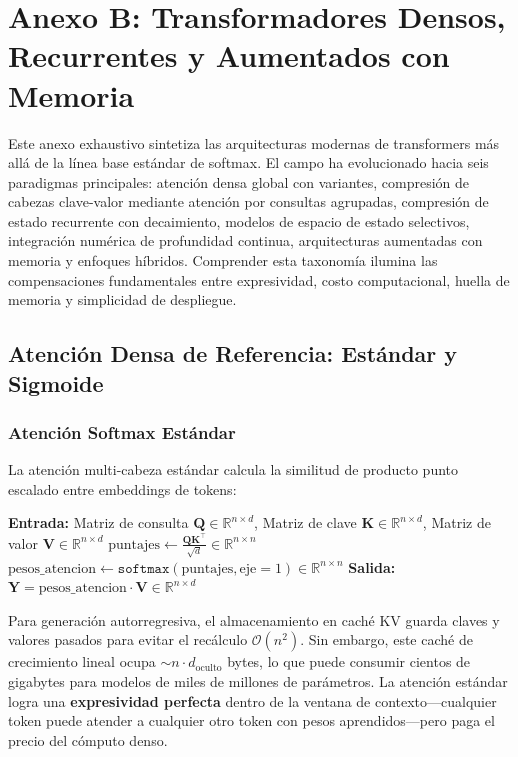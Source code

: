 \section{Anexo B: Transformadores Densos, Recurrentes y Aumentados con Memoria}
\label{sec:annex-transformer}

Este anexo exhaustivo sintetiza las arquitecturas modernas de transformers más allá de la línea base estándar de softmax. El campo ha evolucionado hacia seis paradigmas principales: atención densa global con variantes, compresión de cabezas clave-valor mediante atención por consultas agrupadas, compresión de estado recurrente con decaimiento, modelos de espacio de estado selectivos, integración numérica de profundidad continua, arquitecturas aumentadas con memoria y enfoques híbridos. Comprender esta taxonomía ilumina las compensaciones fundamentales entre expresividad, costo computacional, huella de memoria y simplicidad de despliegue.

\subsection{Atención Densa de Referencia: Estándar y Sigmoide}

\subsubsection{Atención Softmax Estándar}
La atención multi-cabeza estándar \citep{vaswani_attention_2017} calcula la similitud de producto punto escalado entre embeddings de tokens:

\begin{algorithmic}[1]
\State \textbf{Entrada:} Matriz de consulta $\mathbf{Q} \in \mathbb{R}^{n \times d}$, Matriz de clave $\mathbf{K} \in \mathbb{R}^{n \times d}$, Matriz de valor $\mathbf{V} \in \mathbb{R}^{n \times d}$
\State $\text{puntajes} \gets \frac{\mathbf{Q}\mathbf{K}^\top}{\sqrt{d}} \in \mathbb{R}^{n \times n}$ 
\State $\text{pesos\_atencion} \gets \texttt{softmax}(\text{puntajes}, \text{eje}=1) \in \mathbb{R}^{n \times n}$ 
\State \textbf{Salida:} $\mathbf{Y} = \text{pesos\_atencion} \cdot \mathbf{V} \in \mathbb{R}^{n \times d}$ 
\end{algorithmic}

Para generación autorregresiva, el almacenamiento en caché KV guarda claves y valores pasados para evitar el recálculo $\mathcal{O}(n^2)$. Sin embargo, este caché de crecimiento lineal ocupa $\sim n \cdot d_{\text{oculto}}$ bytes, lo que puede consumir cientos de gigabytes para modelos de miles de millones de parámetros. La atención estándar logra una \textbf{expresividad perfecta} dentro de la ventana de contexto---cualquier token puede atender a cualquier otro token con pesos aprendidos---pero paga el precio del cómputo denso.

